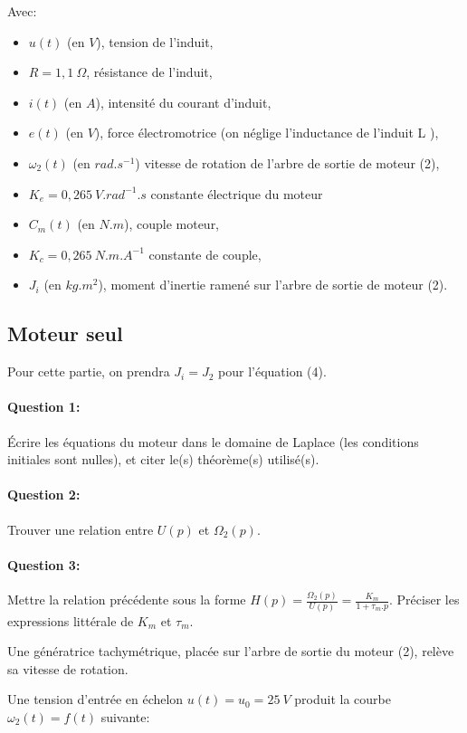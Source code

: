 Avec:
\begin{itemize}
 \item $u(t)$ (en $V$), tension de l'induit,
 \item $R=1,1\ \Omega$, résistance de l'induit,
 \item $i(t)$ (en $A$), intensité du courant d'induit,
 \item $e(t)$ (en $V$), force électromotrice (on néglige l'inductance de l'induit L ),
 \item $\omega_2(t)$ (en $rad.s^{-1}$) vitesse de rotation de l'arbre de sortie de moteur (2),
 \item $K_e=0,265\ V.rad^{-1}.s$ constante électrique du moteur
 \item $C_m(t)$ (en $N.m$), couple moteur,
 \item $K_c=0,265\ N.m.A^{-1}$ constante de couple,
 \item $J_i$ (en $kg.m^2$), moment d'inertie ramené sur l'arbre de sortie de moteur (2).
\end{itemize}

\subsection{Moteur seul}

Pour cette partie, on prendra $J_i=J_2$ pour l'équation (4).

\paragraph{Question 1:} Écrire les équations du moteur dans le domaine de Laplace (les conditions initiales sont nulles), et citer le(s) théorème(s) utilisé(s).

\paragraph{Question 2:} Trouver une relation entre $U(p)$ et $\Omega_2(p)$.

\paragraph{Question 3:} Mettre la relation précédente sous la forme
$H(p)=\frac{\Omega_2(p)}{U(p)}=\frac{K_m}{1+\tau_m.p}$. Préciser les expressions littérale de $K_m$ et $\tau_m$.

Une génératrice tachymétrique, placée sur l'arbre de sortie du moteur (2), relève sa vitesse de rotation.

Une tension d'entrée en échelon $u(t)=u_0=25\ V$ produit la courbe $\omega_2(t)=f(t)$ suivante:

